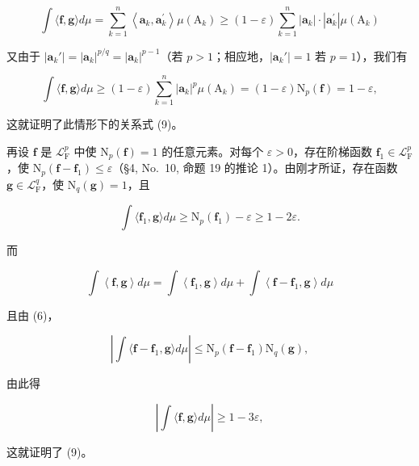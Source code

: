 \[
\int \langle \mathbf {f}, \mathbf {g} \rangle d \mu = \sum_ {k = 1} ^ {n} \left\langle \mathbf {a} _ {k}, \mathbf {a} _ {k} ^ {\prime} \right\rangle \mu \left(\mathrm{A} _ {k}\right) \geqslant (1 - \varepsilon) \sum_ {k = 1} ^ {n} | \mathbf {a} _ {k} | \cdot | \mathbf {a} _ {k} ^ {\prime} | \mu (\mathrm{A} _ {k})
\]

又由于 \(|\mathbf{a}_k'| = |\mathbf{a}_k|^{p / q} = |\mathbf{a}_k|^{p - 1}\)（若 \(p > 1\)；相应地，\(|\mathbf{a}_k'| = 1\) 若 \(p = 1\)），我们有

\[
\int \langle \mathbf {f}, \mathbf {g} \rangle d \mu \geqslant (1 - \varepsilon) \sum_ {k = 1} ^ {n} | \mathbf {a} _ {k} | ^ {p} \mu (\mathrm{A} _ {k}) = (1 - \varepsilon) \mathrm{N} _ {p} (\mathbf {f}) = 1 - \varepsilon ,
\]

这就证明了此情形下的关系式 (9)。

再设 \(\mathbf{f}\) 是 \(\mathcal{L}_{\mathrm{F}}^{p}\) 中使 \(\mathrm{N}_p(\mathbf{f}) = 1\) 的任意元素。对每个 \(\varepsilon > 0\)，存在阶梯函数 \(\mathbf{f}_1 \in \mathcal{L}_{\mathrm{F}}^p\)，使 \(\mathrm{N}_p(\mathbf{f} - \mathbf{f}_1) \leqslant \varepsilon\)（§4, No.~10, 命题 19 的推论 1）。由刚才所证，存在函数 \(\mathbf{g} \in \mathcal{L}_{\mathrm{F}}^q\)，使 \(\mathrm{N}_q(\mathbf{g}) = 1\)，且

\[
\int \langle \mathbf {f} _ {1}, \mathbf {g} \rangle d \mu \geqslant \mathrm{N} _ {p} (\mathbf {f} _ {1}) - \varepsilon \geqslant 1 - 2 \varepsilon .
\]

而

\[
\int \left\langle \mathbf {f}, \mathbf {g} \right\rangle d \mu = \int \left\langle \mathbf {f} _ {1}, \mathbf {g} \right\rangle d \mu + \int \left\langle \mathbf {f} - \mathbf {f} _ {1}, \mathbf {g} \right\rangle d \mu
\]

且由 (6)，

\[
\left| \int \langle \mathbf {f} - \mathbf {f} _ {1}, \mathbf {g} \rangle d \mu \right| \leqslant \mathrm{N} _ {p} (\mathbf {f} - \mathbf {f} _ {1}) \mathrm{N} _ {q} (\mathbf {g}),
\]

由此得

\[
\left| \int \langle \mathbf {f}, \mathbf {g} \rangle d \mu \right| \geqslant 1 - 3 \varepsilon ,
\]

这就证明了 (9)。

